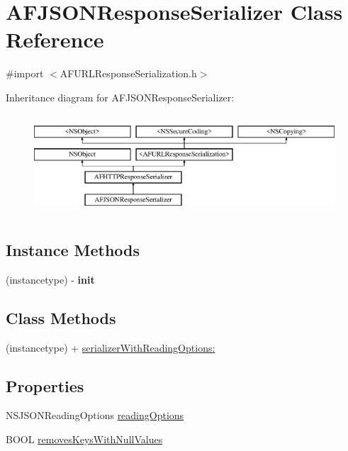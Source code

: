 \hypertarget{interface_a_f_j_s_o_n_response_serializer}{}\section{A\+F\+J\+S\+O\+N\+Response\+Serializer Class Reference}
\label{interface_a_f_j_s_o_n_response_serializer}


{\ttfamily \#import $<$A\+F\+U\+R\+L\+Response\+Serialization.\+h$>$}

Inheritance diagram for A\+F\+J\+S\+O\+N\+Response\+Serializer\+:\begin{figure}[H]
\begin{center}
\leavevmode
\includegraphics[height=3.771044cm]{interface_a_f_j_s_o_n_response_serializer}
\end{center}
\end{figure}
\subsection*{Instance Methods}
\begin{DoxyCompactItemize}
\item 
\hypertarget{interface_a_f_j_s_o_n_response_serializer_a05c10f46317a64479c52c870213479b8}{}(instancetype) -\/ {\bfseries init}\label{interface_a_f_j_s_o_n_response_serializer_a05c10f46317a64479c52c870213479b8}

\end{DoxyCompactItemize}
\subsection*{Class Methods}
\begin{DoxyCompactItemize}
\item 
(instancetype) + \hyperlink{interface_a_f_j_s_o_n_response_serializer_a84c05ae2bc646684aa9cb39041687979}{serializer\+With\+Reading\+Options\+:}
\end{DoxyCompactItemize}
\subsection*{Properties}
\begin{DoxyCompactItemize}
\item 
N\+S\+J\+S\+O\+N\+Reading\+Options \hyperlink{interface_a_f_j_s_o_n_response_serializer_a344e139d77d63a22446f3c95990d2bce}{reading\+Options}
\item 
B\+O\+O\+L \hyperlink{interface_a_f_j_s_o_n_response_serializer_af7be2fbd6e630440952f10bf448569aa}{removes\+Keys\+With\+Null\+Values}
\end{DoxyCompactItemize}


